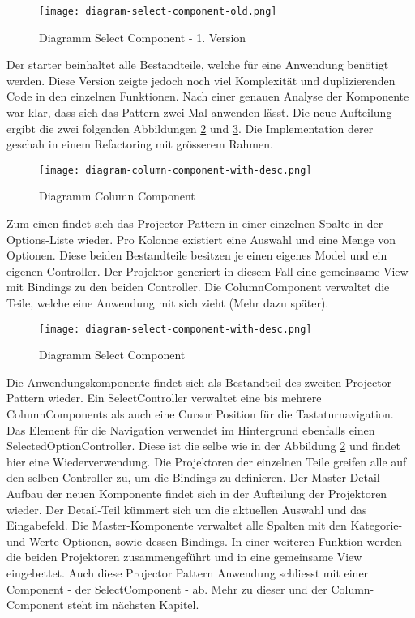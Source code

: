 \begin{figure}[!htb]
    \centering
    \texttt{[image: diagram-select-component-old.png]}
    \caption{Diagramm Select Component - 1. Version}
    \label{img:DiagramSelectComponentOld}
\end{figure}

Der starter beinhaltet alle Bestandteile, welche für eine Anwendung benötigt werden.
Diese Version zeigte jedoch noch viel Komplexität und duplizierenden Code in den einzelnen Funktionen.
Nach einer genauen Analyse der Komponente war klar, dass sich das Pattern zwei Mal anwenden lässt.
Die neue Aufteilung ergibt die zwei folgenden Abbildungen \ref{img:DiagramColumnComponent} und \ref{img:DiagramSelectComponent}.
Die Implementation derer geschah in einem Refactoring mit grösserem Rahmen.

\begin{figure}[!htb]
    \centering
    \texttt{[image: diagram-column-component-with-desc.png]}
    \caption{Diagramm Column Component}
    \label{img:DiagramColumnComponent}
\end{figure}

Zum einen findet sich das Projector Pattern in einer einzelnen Spalte in der Options-Liste wieder.
Pro Kolonne existiert eine Auswahl und eine Menge von Optionen.
Diese beiden Bestandteile besitzen je einen eigenes Model und ein eigenen Controller.
Der Projektor generiert in diesem Fall eine gemeinsame View mit Bindings zu den beiden Controller.
Die ColumnComponent verwaltet die Teile, welche eine Anwendung mit sich zieht (Mehr dazu später).

\begin{figure}[!htb]
    \centering
    \texttt{[image: diagram-select-component-with-desc.png]}
    \caption{Diagramm Select Component}
    \label{img:DiagramSelectComponent}
\end{figure}

Die Anwendungskomponente findet sich als Bestandteil des zweiten Projector Pattern wieder.
Ein SelectController verwaltet eine bis mehrere ColumnComponents als auch eine Cursor Position für die Tastaturnavigation.
Das Element für die Navigation verwendet im Hintergrund ebenfalls einen SelectedOptionController. 
Diese ist die selbe wie in der Abbildung \ref{img:DiagramColumnComponent} und findet hier eine Wiederverwendung.
Die Projektoren der einzelnen Teile greifen alle auf den selben Controller zu, um die Bindings zu definieren.
Der Master-Detail-Aufbau der neuen Komponente findet sich in der Aufteilung der Projektoren wieder.
Der Detail-Teil kümmert sich um die aktuellen Auswahl und das Eingabefeld.
Die Master-Komponente verwaltet alle Spalten mit den Kategorie- und Werte-Optionen, sowie dessen Bindings.
In einer weiteren Funktion werden die beiden Projektoren zusammengeführt und in eine gemeinsame View eingebettet.
Auch diese Projector Pattern Anwendung schliesst mit einer Component - der SelectComponent - ab.
Mehr zu dieser und der Column-Component steht im nächsten Kapitel.


